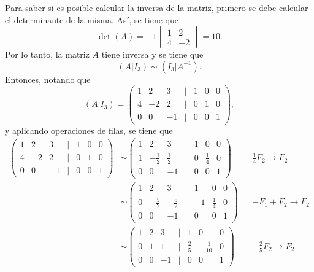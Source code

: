 \documentclass[11pt,respuestas,a4]{aleph-examen}
\begin{document}
\begin{preguntas}
\begin{respuesta}
    Para saber si es posible calcular la inversa de la matriz, primero se debe calcular el determinante de la misma. Así, se tiene que
    \[
        \det(A) = -1\begin{vmatrix}
            1 & 2 \\
            4 & -2    
        \end{vmatrix} = 10.
    \]
    Por lo tanto, la matriz $A$ tiene inversa y se tiene que
    \[
        (A|I_3)\sim (I_3|A^{-1}).
    \]
    Entonces, notando que 
    \[
        (A|I_3) = \begin{pmatrix}
            1 & 2 & 3 & | & 1 & 0 & 0 \\
            4 & -2 & 2 & | & 0 & 1 & 0 \\
            0 & 0 & -1 & | & 0 & 0 & 1
        \end{pmatrix},    
    \]
    y aplicando operaciones de filas, se tiene que
    \begin{align*}
        \begin{pmatrix}
            1 & 2 & 3 & | & 1 & 0 & 0 \\
            4 & -2 & 2 & | & 0 & 1 & 0 \\
            0 & 0 & -1 & | & 0 & 0 & 1
        \end{pmatrix} & \sim \begin{pmatrix}
            1 & 2 & 3 & | & 1 & 0 & 0 \\
            1 & -\frac{1}{2} & \frac{1}{2} & | & 0 & \frac{1}{4} & 0 \\
            0 & 0 & -1 & | & 0 & 0 & 1
        \end{pmatrix} && \frac{1}{4} F_2 \rightarrow F_2 \\
        & \sim \begin{pmatrix}
            1 & 2 & 3 & | & 1 & 0 & 0 \\
            0 & -\frac{5}{2} & -\frac{5}{2} & | & -1 & \frac{1}{4} & 0 \\
            0 & 0 & -1 & | & 0 & 0 & 1
        \end{pmatrix} && - F_1 + F_2 \rightarrow F_2 \\
        & \sim \begin{pmatrix}
            1 & 2 & 3 & | & 1 & 0 & 0 \\
            0 & 1 & 1 & | & \frac{2}{5} & -\frac{1}{10} & 0 \\
            0 & 0 & -1 & | & 0 & 0 & 1
        \end{pmatrix} && -\frac{2}{5} F_2 \rightarrow F_2 \\

\end{align*}
\end{respuesta}
\end{preguntas}
\end{document}
